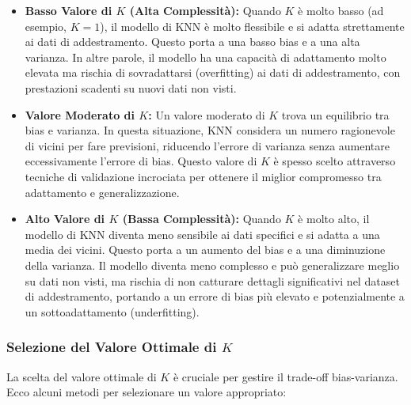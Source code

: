 \begin{itemize}
    \item \textbf{Basso Valore di \( K \) (Alta Complessità):} Quando \( K \) è molto basso (ad esempio, \( K = 1 \)), il modello di KNN è molto flessibile e si adatta strettamente ai dati di addestramento. Questo porta a una basso bias e a una alta varianza. In altre parole, il modello ha una capacità di adattamento molto elevata ma rischia di sovradattarsi (overfitting) ai dati di addestramento, con prestazioni scadenti su nuovi dati non visti.

    \item \textbf{Valore Moderato di \( K \):} Un valore moderato di \( K \) trova un equilibrio tra bias e varianza. In questa situazione, KNN considera un numero ragionevole di vicini per fare previsioni, riducendo l'errore di varianza senza aumentare eccessivamente l'errore di bias. Questo valore di \( K \) è spesso scelto attraverso tecniche di validazione incrociata per ottenere il miglior compromesso tra adattamento e generalizzazione.

    \item \textbf{Alto Valore di \( K \) (Bassa Complessità):} Quando \( K \) è molto alto, il modello di KNN diventa meno sensibile ai dati specifici e si adatta a una media dei vicini. Questo porta a un aumento del bias e a una diminuzione della varianza. Il modello diventa meno complesso e può generalizzare meglio su dati non visti, ma rischia di non catturare dettagli significativi nel dataset di addestramento, portando a un errore di bias più elevato e potenzialmente a un sottoadattamento (underfitting).

\end{itemize}

\subsubsection{Selezione del Valore Ottimale di \( K \)}

La scelta del valore ottimale di \( K \) è cruciale per gestire il trade-off bias-varianza. Ecco alcuni metodi per selezionare un valore appropriato:

